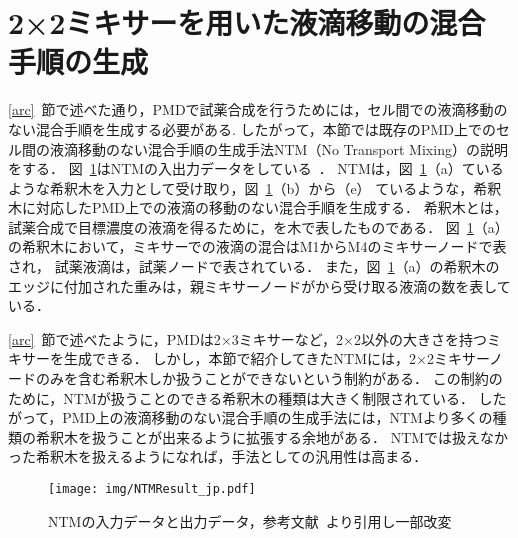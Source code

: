 \section{{2×2ミキサーを用いた液滴移動の混合手順の生成}}
\ref{arc}~節で述べた通り，PMDで試薬合成を行うためには，セル間での液滴移動のない混合手順を生成する必要がある.
したがって，本節では既存のPMD上でのセル間の液滴移動のない混合手順の生成手法NTM（No Transport Mixing）の説明をする．
図~\ref{fig:ntmresult}はNTMの入出力データをしている~\cite{4}．
NTMは，図~\ref{fig:ntmresult}（a）ているような希釈木を入力として受け取り，図~\ref{fig:ntmresult}（b）から（e）
ているような，希釈木に対応したPMD上での液滴の移動のない混合手順を生成する．
希釈木とは，試薬合成で目標濃度の液滴を得るために，を木で表したものである．
図~\ref{fig:ntmresult}（a）の希釈木において，ミキサーでの液滴の混合はM1からM4のミキサーノードで表され，
試薬液滴は，試薬ノードで表されている．
また，図~\ref{fig:ntmresult}（a）の希釈木のエッジに付加された重みは，親ミキサーノードがから受け取る液滴の数を表している．

\ref{arc}~節で述べたように，PMDは2$\times$3ミキサーなど，2$\times$2以外の大きさを持つミキサーを生成できる．
しかし，本節で紹介してきたNTMには，2$\times$2ミキサーノードのみを含む希釈木しか扱うことができないという制約がある．
この制約のために，NTMが扱うことのできる希釈木の種類は大きく制限されている．
したがって，PMD上の液滴移動のない混合手順の生成手法には，NTMより多くの種類の希釈木を扱うことが出来るように拡張する余地がある．
NTMでは扱えなかった希釈木を扱えるようになれば，手法としての汎用性は高まる．
\begin{figure}[tbp]
 \centering\texttt{[image: img/NTMResult\_jp.pdf]}
    \caption{NTMの入力データと出力データ，参考文献~\cite{4}より引用し一部改変}\label{fig:ntmresult}
\end{figure}

